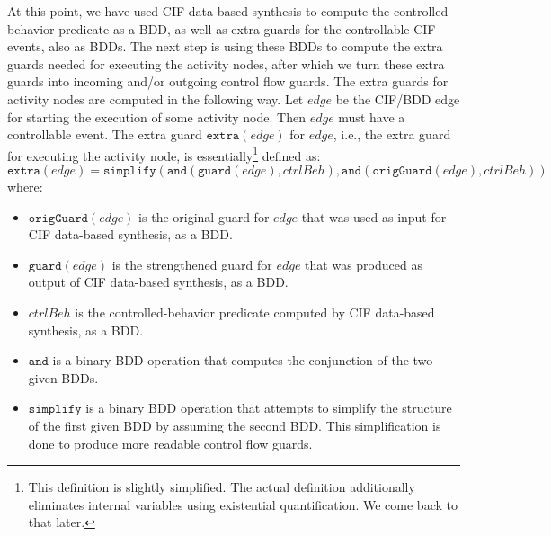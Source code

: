 \documentclass{article}
\theoremstyle{definition}
\begin{document}
At this point, we have used CIF data-based synthesis to compute the controlled-behavior predicate as a BDD, as well as extra guards for the controllable CIF events, also as BDDs.
The next step is using these BDDs to compute the extra guards needed for executing the activity nodes, after which we turn these extra guards into incoming and/or outgoing control flow guards.
The extra guards for activity nodes are computed in the following way.
Let $\mathit{edge}$ be the CIF/BDD edge for starting the execution of some activity node.
Then $\mathit{edge}$ must have a controllable event.
The extra guard $\texttt{extra}(\mathit{edge})$ for $\mathit{edge}$, i.e., the extra guard for executing the activity node, is essentially\footnote{This definition is slightly simplified.
The actual definition additionally eliminates internal variables using existential quantification.
We come back to that later.} defined as:
\begin{equation*}
	\texttt{extra}(\mathit{edge}) = \texttt{simplify}(\texttt{and}(\texttt{guard}(\mathit{edge}), \mathit{ctrlBeh}), \texttt{and}(\texttt{origGuard}(\mathit{edge}), \mathit{ctrlBeh}))
\end{equation*}
where:
\begin{itemize}
	\item $\texttt{origGuard}(\mathit{edge})$ is the original guard for $\mathit{edge}$ that was used as input for CIF data-based synthesis, as a BDD.
	\item $\texttt{guard}(\mathit{edge})$ is the strengthened guard for $\mathit{edge}$ that was produced as output of CIF data-based synthesis, as a BDD.
	\item $\mathit{ctrlBeh}$ is the controlled-behavior predicate computed by CIF data-based synthesis, as a BDD.
	\item $\texttt{and}$ is a binary BDD operation that computes the conjunction of the two given BDDs.
	\item $\texttt{simplify}$ is a binary BDD operation that attempts to simplify the structure of the first given BDD by assuming the second BDD.
	This simplification is done to produce more readable control flow guards.
\end{itemize}
\end{document}
